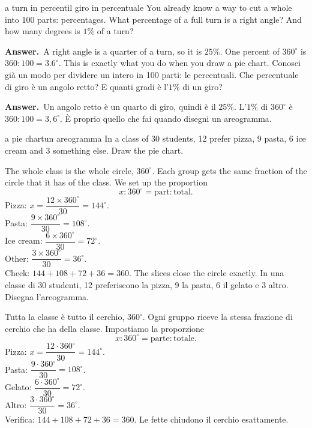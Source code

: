 \documentclass[10pt,a4paper,oneside]{book}
\newif\ifIT
\newcommand{\answer}{\par\vspace{2pt}{\color{deeporange}\rule[0.5ex]{\linewidth}{0.4pt}}\par
  {\sffamily\bfseries\small\color{deeporange}\ifIT Risposta\else Answer\fi.}\ }
\begin{document}
\begin{think}{a turn in percent}{il giro in percentuale}
You already know a way to cut a whole into 100 parts: percentages. What percentage of a full turn is a right angle? And how many degrees is $1\%$ of a turn?
\answer A right angle is a quarter of a turn, so it is $25\%$. One percent of $360^\circ$ is $360 : 100 = 3.6^\circ$. This is exactly what you do when you draw a pie chart.
\tcblower
Conosci già un modo per dividere un intero in 100 parti: le percentuali. Che percentuale di giro è un angolo retto? E quanti gradi è l'$1\%$ di un giro?
\answer Un angolo retto è un quarto di giro, quindi è il $25\%$. L'$1\%$ di $360^\circ$ è $360 : 100 = 3{,}6^\circ$. È proprio quello che fai quando disegni un areogramma.
\end{think}

\begin{example}{a pie chart}{un areogramma}
In a class of 30 students, 12 prefer pizza, 9 pasta, 6 ice cream and 3 something else. Draw the pie chart.

The whole class is the whole circle, $360^\circ$. Each group gets the same fraction of the circle that it has of the class. We set up the proportion
\[ x : 360^\circ = \text{part} : \text{total}. \]
Pizza: $x = \dfrac{12 \times 360^\circ}{30} = 144^\circ$. \\
Pasta: $\dfrac{9 \times 360^\circ}{30} = 108^\circ$. \\
Ice cream: $\dfrac{6 \times 360^\circ}{30} = 72^\circ$. \\
Other: $\dfrac{3 \times 360^\circ}{30} = 36^\circ$. \\
Check: $144 + 108 + 72 + 36 = 360$. The slices close the circle exactly.
\tcblower
In una classe di 30 studenti, 12 preferiscono la pizza, 9 la pasta, 6 il gelato e 3 altro. Disegna l'areogramma.

Tutta la classe è tutto il cerchio, $360^\circ$. Ogni gruppo riceve la stessa frazione di cerchio che ha della classe. Impostiamo la proporzione
\[ x : 360^\circ = \text{parte} : \text{totale}. \]
Pizza: $x = \dfrac{12 \cdot 360^\circ}{30} = 144^\circ$. \\
Pasta: $\dfrac{9 \cdot 360^\circ}{30} = 108^\circ$. \\
Gelato: $\dfrac{6 \cdot 360^\circ}{30} = 72^\circ$. \\
Altro: $\dfrac{3 \cdot 360^\circ}{30} = 36^\circ$. \\
Verifica: $144 + 108 + 72 + 36 = 360$. Le fette chiudono il cerchio esattamente.
\end{example}
\end{document}

